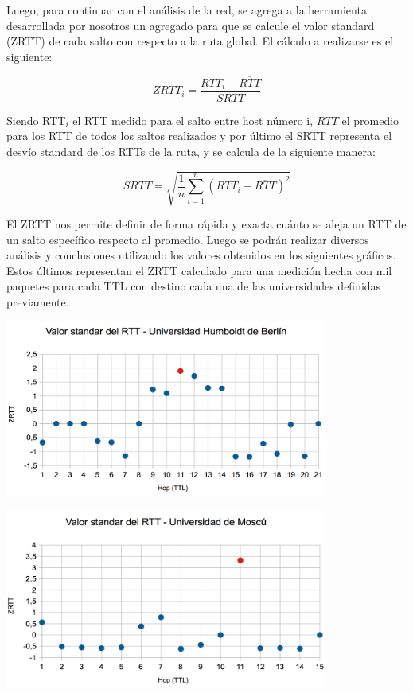 Luego, para continuar con el análisis de la red, se agrega a la herramienta desarrollada por nosotros un agregado para que se calcule el valor standard (ZRTT) de cada salto con respecto a la ruta global. El cálculo a realizarse es el siguiente:

 \begin{equation}
 	ZRTT_i = \frac{RTT_i - \overline{RTT}}{SRTT} 
 \end{equation}

 Siendo RTT$_{i}$ el RTT medido para el salto entre host número i, $\overline{RTT}$ el promedio para los RTT de todos los saltos realizados y por último el SRTT representa el desvío standard de los RTTs de la ruta, y se calcula de la siguiente manera:

\begin{equation}
 	SRTT = \sqrt{\frac{1}{n} \sum_{i=1}^{n} (RTT_i - \overline{RTT})^2}
 \end{equation}

El ZRTT nos permite definir de forma rápida y exacta cuánto se aleja un RTT de un salto específico respecto al promedio. Luego se podrán realizar diversos análisis y conclusiones utilizando los valores obtenidos en los siguientes gráficos. Estos últimos representan el ZRTT calculado para una medición hecha con mil paquetes para cada TTL con destino cada una de las universidades definidas previamente. 

\centerline{\includegraphics[width=0.8\textwidth]{imagenes/1ra_parte/Alemania_3ergrafico.png}}

\centerline{\includegraphics[width=0.8\textwidth]{imagenes/1ra_parte/Rusia_3ergrafico.png}}

